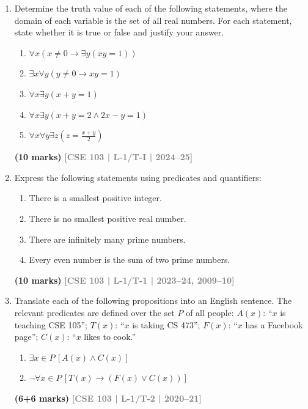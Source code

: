 \documentclass[12pt,a3paper]{article}
\newcommand{\yr}[1]{\hfill\textcolor{gray}{\small\textbf{[#1]}}}
\newcommand{\mk}[1]{\textcolor{orange!70!black}{\small\textbf{(#1 marks)}}}
\begin{document}
\begin{enumerate}


\item Determine the truth value of each of the following statements, where the domain of each variable is the set of all real numbers. For each statement, state whether it is true or false and justify your answer.
\begin{enumerate}
    \item $\forall x (x \neq 0 \rightarrow \exists y (xy = 1))$
    \item $\exists x \forall y (y \neq 0 \rightarrow xy = 1)$
    \item $\forall x \exists y (x + y = 1)$
    \item $\forall x \exists y (x + y = 2 \wedge 2x - y = 1)$
    \item $\forall x \forall y \exists z \left(z = \frac{x + y}{2}\right)$
\end{enumerate}
\mk{10} \yr{CSE 103 | L-1/T-I | 2024--25}


\item Express the following statements using predicates and quantifiers:
\begin{enumerate}
  \item There is a smallest positive integer.
  \item There is no smallest positive real number.
  \item There are infinitely many prime numbers.
  \item Every even number is the sum of two prime numbers.
\end{enumerate}
\mk{10} \yr{CSE 103 | L-1/T-1 | 2023--24, 2009--10}

\item Translate each of the following propositions into an English sentence. The relevant predicates are defined over the set $P$ of all people: $A(x)$: ``$x$ is teaching CSE 105''; $T(x)$: ``$x$ is taking CS 473''; $F(x)$: ``$x$ has a Facebook page''; $C(x)$: ``$x$ likes to cook.''
\begin{enumerate}
  \item $\exists x \in P\,[A(x) \land C(x)]$
  \item $\lnot\forall x \in P\,[T(x) \to (F(x) \lor C(x))]$
\end{enumerate}
\mk{6+6} \yr{CSE 103 | L-1/T-2 | 2020--21}  


\end{enumerate}
\end{document}
